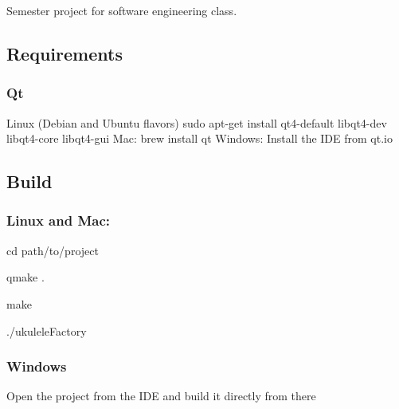 Semester project for software engineering class. \subsection*{Requirements}

\subsubsection*{Qt}

Linux (Debian and Ubuntu flavors) {\ttfamily sudo apt-\/get install qt4-\/default libqt4-\/dev libqt4-\/core libqt4-\/gui} Mac\+: brew install qt Windows\+: Install the I\+DE from qt.\+io

\subsection*{Build}

\subsubsection*{Linux and Mac\+:}


\begin{DoxyItemize}
\item {\ttfamily cd path/to/project}
\item {\ttfamily qmake .}
\item {\ttfamily make}
\item {\ttfamily ./ukulele\+Factory} \subsubsection*{Windows}
\end{DoxyItemize}

Open the project from the I\+DE and build it directly from there 